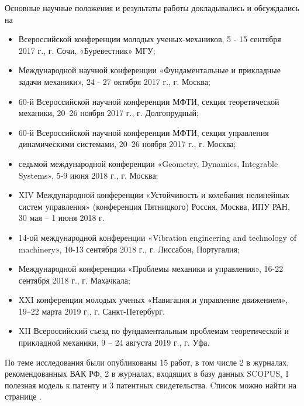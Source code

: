 Основные научные положения и результаты работы докладывались и обсуждались на 
\begin{itemize}
	\item Всероссийской конференции молодых ученых-механиков, 5 - 15 сентября 2017 г., г. Сочи, «Буревестник» МГУ;
	\item Международной научной конференции «Фундаментальные и прикладные задачи механики», 24 - 27 октября 2017 г., г. Москва;
	\item 60-й Всероссийской научной конференции МФТИ, секция теоретической механики, 20–26 ноября 2017 г., г. Долгопрудный;
	\item 60-й Всероссийской научной конференции МФТИ, секция управления динамическими системами, 20–26 ноября 2017 г., г. Москва;
	\item седьмой международной конференции «Geometry, Dynamics, Integrable Systems», 5-9 июня 2018 г., г. Москва;
	\item XIV Международной конференции «Устойчивость и колебания нелинейных систем управления» (конференция Пятницкого) Россия, Москва, ИПУ РАН, 30 мая -- 1 июня 2018 г.
	\item 14-ой международной конференции «Vibration engineering and technology of machinery», 10-13 сентября 2018 г., г. Лиссабон, Португалия;
	\item Международной конференции «Проблемы механики и управления», 16-22 сентября 2018 г., г. Махачкала;
	\item XXI конференции молодых ученых «Навигация и управление движением», 19–22 марта 2019 г., г. Санкт-Петербург.
	\item XII Всероссийский съезд по фундаментальным проблемам теоретической и прикладной механики, 9 -- 24 августа 2019 г., г. Уфа.
\end{itemize}
По теме исследования были опубликованы 15 работ, в том числе 2 в журналах, рекомендованных ВАК РФ, 2 в журналах, входящих в базу данных SCOPUS, 1 полезная модель к патенту и 3 патентных свидетельства. Cписок можно найти на странице \pageref{list_chapter}.

